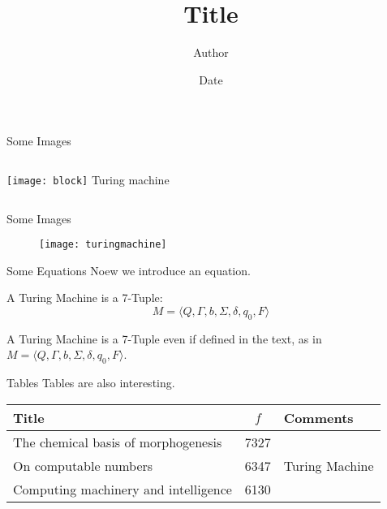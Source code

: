 \documentclass{beamer}
\title              {Title}
\author             {Author}
\institute          {Institute, University of Basel}
\date               {Date}
\begin{document}
\begin{frame}[t,plain]
\titlepage
\end{frame}


\begin{frame}[c]{Some Images}
\begin{columns}
            \texttt{[image: block]}
            Turing machine
\end{columns}
\end{frame}


\begin{frame}[c]{Some Images}
    \begin{figure}
        \texttt{[image: turingmachine]}
    \end{figure}
\end{frame}


\begin{frame}[c]{Some Equations}
Noew we introduce an equation.
\begin{theorem}
A Turing Machine is a 7-Tuple:
\begin{equation}
    M = \langle Q, \Gamma, b, \Sigma, \delta, q_0, F \rangle
\end{equation}
\end{theorem}
A Turing Machine is a 7-Tuple even if defined in the text, as in $M = \langle Q, \Gamma, b, \Sigma, \delta, q_0, F \rangle$.
\end{frame}


\begin{frame}[c]{Tables}
Tables are also interesting.
\begin{table}[ht!]
\centering
\begin{tabular}{|l|c|l|} \hline
Title&$f$&Comments\\ \hline
The chemical basis of morphogenesis & 7327 & \\ \hline
On computable numbers & 6347 & Turing Machine\\ \hline
Computing machinery and intelligence & 6130 & \\ \hline
\end{tabular}
\end{table}
\end{frame}
\end{document}
